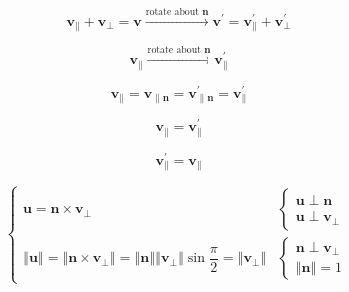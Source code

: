 \documentclass[
]{book}
\theoremstyle{definition}
\theoremstyle{definition}
\theoremstyle{definition}
\theoremstyle{definition}
\theoremstyle{remark}
\begin{document}
\[
\boldsymbol{v}_{{\scriptscriptstyle \parallel}}+\boldsymbol{v}_{{\scriptscriptstyle \perp}}=\boldsymbol{v}\xrightarrow{\text{rotate about }\boldsymbol{n}}\boldsymbol{v}^{\prime}=\boldsymbol{v}_{{\scriptscriptstyle \parallel}}^{\prime}+\boldsymbol{v}_{{\scriptscriptstyle \perp}}^{\prime}
\]

\[
\boldsymbol{v}_{{\scriptscriptstyle \parallel}}\xrightarrow{\text{rotate about }\boldsymbol{n}}\boldsymbol{v}_{{\scriptscriptstyle \parallel}}^{\prime}
\]

\[
\boldsymbol{v}_{{\scriptscriptstyle \parallel}}=\boldsymbol{v}_{{\scriptscriptstyle \parallel\boldsymbol{n}}}=\boldsymbol{v}_{{\scriptscriptstyle \parallel\boldsymbol{n}}}^{\prime}=\boldsymbol{v}_{{\scriptscriptstyle \parallel}}^{\prime}
\]

\[
\boldsymbol{v}_{{\scriptscriptstyle \parallel}}=\boldsymbol{v}_{{\scriptscriptstyle \parallel}}^{\prime}
\]

\[
\boldsymbol{v}_{{\scriptscriptstyle \parallel}}^{\prime}=\boldsymbol{v}_{{\scriptscriptstyle \parallel}}
\]

\[
\begin{cases}
\boldsymbol{u}=\boldsymbol{n}\times\boldsymbol{v}_{{\scriptscriptstyle \perp}} & \begin{cases}
\boldsymbol{u}\perp\boldsymbol{n}\\
\boldsymbol{u}\perp\boldsymbol{v}_{{\scriptscriptstyle \perp}}
\end{cases}\\
\left\Vert \boldsymbol{u}\right\Vert =\left\Vert \boldsymbol{n}\times\boldsymbol{v}_{{\scriptscriptstyle \perp}}\right\Vert =\left\Vert \boldsymbol{n}\right\Vert \left\Vert \boldsymbol{v}_{{\scriptscriptstyle \perp}}\right\Vert \sin\dfrac{\pi}{2}=\left\Vert \boldsymbol{v}_{{\scriptscriptstyle \perp}}\right\Vert  & \begin{cases}
\boldsymbol{n}\perp\boldsymbol{v}_{{\scriptscriptstyle \perp}}\\
\left\Vert \boldsymbol{n}\right\Vert =1
\end{cases}
\end{cases}
\]
\end{document}
